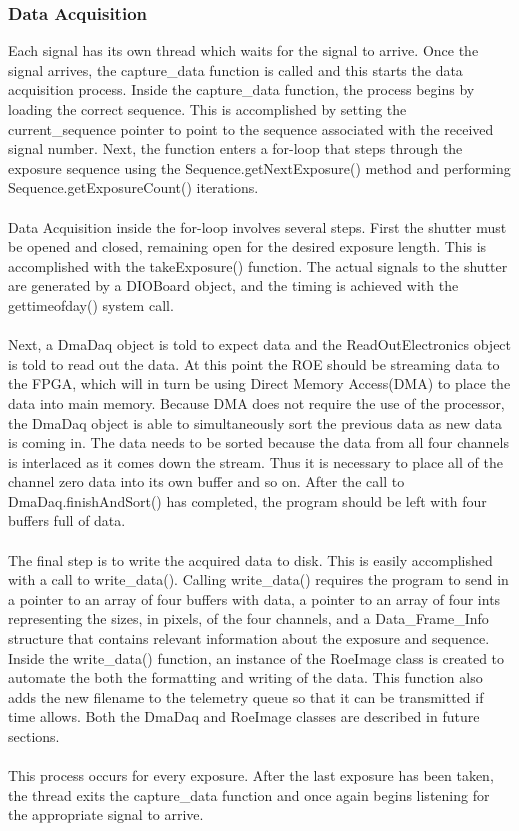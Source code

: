\subsubsection{Data Acquisition}
Each signal has its own thread which waits for the signal to arrive. Once the signal arrives,
the capture\_data function is called and this starts the data acquisition process. Inside the
capture\_data function, the process begins by loading the correct sequence. This is accomplished
by setting the current\_sequence pointer to point to the sequence associated with the received
signal number. Next, the function enters a for-loop that steps through the exposure sequence
using the Sequence.getNextExposure() method and performing Sequence.getExposureCount() iterations.\\
\\
Data Acquisition inside the for-loop involves several steps. First the shutter must be opened and closed,
remaining open for the desired exposure length. This is accomplished with the takeExposure() function.
The actual signals to the shutter are generated by a DIOBoard object, and the timing is achieved with
the gettimeofday() system call. \\
\\
Next, a DmaDaq object is told to expect data and the ReadOutElectronics
object is told to read out the data. At this point the ROE should be streaming data to the FPGA, which
will in turn be using Direct Memory Access(DMA) to place the data into main memory. Because DMA does not
require the use of the processor, the DmaDaq object is able to simultaneously sort the previous data as
new data is coming in. The data needs to be sorted because the data from all four channels is interlaced
as it comes down the stream. Thus it is necessary to place all of the channel zero data into its own
buffer and so on. After the call to DmaDaq.finishAndSort() has completed, the program should be left with
four buffers full of data. \\
\\
The final step is to write the acquired data to disk. This is easily accomplished with a call to write\_data().
Calling write\_data() requires the program to send in a pointer to an array of four buffers with data, a pointer
to an array of four ints representing the sizes, in pixels, of the four channels, and a Data\_Frame\_Info structure
that contains relevant information about the exposure and sequence. Inside the write\_data() function, an instance
of the RoeImage class is created to automate the both the formatting and writing of the data. This function also 
adds the new filename to the telemetry queue so that it can be transmitted if time allows. Both the DmaDaq and RoeImage
classes are described in future sections.\\
\\
This process occurs for every exposure. After the last exposure has been taken, the thread exits the capture\_data
function and once again begins listening for the appropriate signal to arrive.

